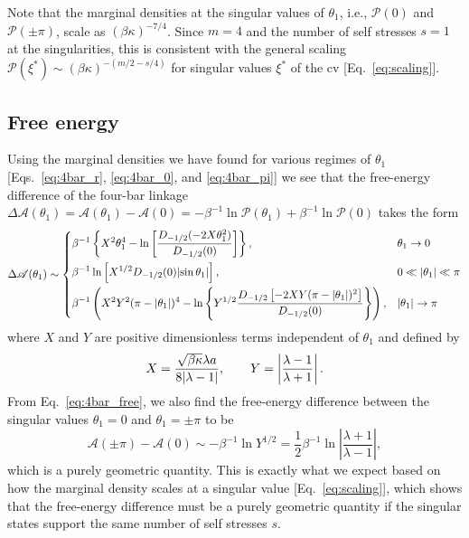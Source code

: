 Note that the marginal densities at the singular values of $\theta_{1}$, i.e., $\mathscr{P}(0)$ and $\mathscr{P}(\pm\pi)$, scale as $(\beta\kappa)^{-7/4}$.
Since $m = 4$ and the number of self stresses $s = 1$ at the singularities, this is consistent with the general scaling $\mathscr{P}(\xi^{*}) \sim (\beta\kappa)^{-(m/2 - s/4)}$ for singular values $\xi^{*}$ of the \ac{cv} [Eq.~\eqref{eq:scaling}].

\subsection{Free energy}

Using the marginal densities we have found for various regimes of $\theta_{1}$ [Eqs.~\eqref{eq:4bar_r}, \eqref{eq:4bar_0}, and \eqref{eq:4bar_pi}] we see that the free-energy difference of the four-bar linkage $\Delta\mathscr{A}(\theta_1) = \mathscr{A}(\theta_1) - \mathscr{A}(0) = -\beta^{-1}\ln{\mathscr{P}(\theta_1)} + \beta^{-1}\ln{\mathscr{P}(0)}$ takes the form
%
\begin{equation}
  \Delta\mathscr{A}(\theta_1) \sim
\begin{dcases}
  \beta^{-1}\left\{X^2\theta_1^4 - \ln\left[\dfrac{D_{-1/2}(-2X\theta_1^2)}{D_{-1/2}(0)}\right]\right\}, & \theta_1 \to 0\\
  \beta^{-1}\ln\left[X^{1/2}D_{-1/2}(0)\lvert\sin{\theta_1}\rvert\right], & 0 \ll \lvert\theta_1\rvert \ll \pi\\
  \beta^{-1}\left(X^2Y^2(\pi - \lvert\theta_1\rvert)^4 - \ln\left\{Y^{1/2}\dfrac{D_{-1/2}\left[-2XY(\pi - \lvert\theta_1\rvert)^2\right]}{D_{-1/2}(0)}\right\}\right), & \lvert\theta_1\rvert \to \pi
\end{dcases}
  \label{eq:4bar_free}
\end{equation}
%
where $X$ and $Y$ are positive dimensionless terms independent of $\theta_1$ and defined by
%
\begin{equation}
  X = \frac{\sqrt{\beta\kappa}\lambda a}{8\lvert\lambda-1\rvert},\qquad
  Y = \left|\frac{\lambda-1}{\lambda+1}\right|.
  \label{eq:XandY}
\end{equation}
%
From Eq.~\eqref{eq:4bar_free}, we also find the free-energy difference between the singular values $\theta_{1} = 0$ and $\theta_{1} = \pm\pi$ to be
%
\begin{equation}
  \mathscr{A}(\pm\pi) - \mathscr{A}(0) \sim -\beta^{-1}\ln{Y^{1/2}} = \frac{1}{2}\beta^{-1}\ln\left|\frac{\lambda + 1}{\lambda - 1}\right|,
\end{equation}
%
which is a purely geometric quantity.
This is exactly what we expect based on how the marginal density scales at a singular value [Eq.~\eqref{eq:scaling}], which shows that the free-energy difference must be a purely geometric quantity if the singular states support the same number of self stresses $s$.
